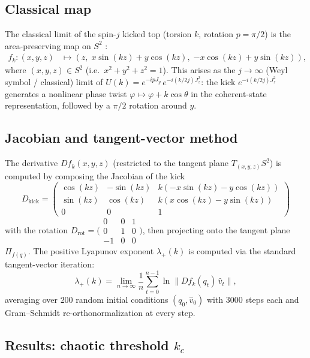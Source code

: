 \documentclass[12pt,a4paper]{article}
\begin{document}
\subsection{Classical map}

The classical limit of the spin-$j$ kicked top (torsion $k$, rotation
$p = \pi/2$) is the area-preserving map on $S^2$
\cite{haake1987,haake2010}:
\begin{align}
  \label{eq:kicked_top_map}
  f_k : (x,y,z) &\longmapsto (z,\;x\sin(kz)+y\cos(kz),\;
                              {-x\cos(kz)+y\sin(kz)}),
\end{align}
where $(x,y,z) \in S^2$ (i.e.\ $x^2+y^2+z^2=1$).
This arises as the $j\to\infty$ (Weyl symbol / classical) limit of
$U(k) = e^{-ip J_y}\,e^{-i(k/2j)J_z^2}$: the kick $e^{-i(k/2j)J_z^2}$
generates a nonlinear phase twist $\varphi \mapsto \varphi + k\cos\theta$
in the coherent-state representation, followed by a $\pi/2$ rotation
around $y$.

\subsection{Jacobian and tangent-vector method}

The derivative $Df_k(x,y,z)$ (restricted to the tangent plane $T_{(x,y,z)}S^2$)
is computed by composing the Jacobian of the kick
\[
  D_{\mathrm{kick}} = \begin{pmatrix} \cos(kz) & -\sin(kz) & k(-x\sin(kz)-y\cos(kz)) \\
    \sin(kz) & \cos(kz) & k(x\cos(kz)-y\sin(kz)) \\ 0 & 0 & 1 \end{pmatrix}
\]
with the rotation $D_{\mathrm{rot}} = \bigl(\begin{smallmatrix}0&0&1\\0&1&0\\-1&0&0\end{smallmatrix}\bigr)$,
then projecting onto the tangent plane $\Pi_{f(q)}$.
The positive Lyapunov exponent $\lambda_+(k)$ is computed via the standard
tangent-vector iteration:
\[
  \lambda_+(k) = \lim_{n\to\infty}\frac{1}{n}\sum_{t=0}^{n-1}
  \ln\|Df_k(q_t)\,\hat v_t\|,
\]
averaging over $200$ random initial conditions $(q_0,\hat v_0)$ with
$3000$ steps each and Gram--Schmidt re-orthonormalization at every step.

\subsection{Results: chaotic threshold $k_c$}
\end{document}
